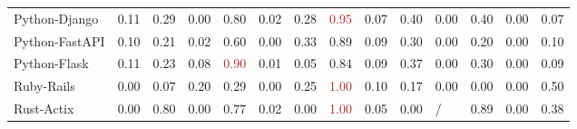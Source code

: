 \begin{table*}[h]
{\begin{tabular}{
l
x{1}{2}
x{1}{2}
x{1}{2}
x{1}{2}
x{1}{2}
x{1}{2}
x{1}{2}
x{1}{2}
x{1}{2}
x{1}{2}
x{1}{2}
x{1}{2}
x{1}{2}
}
Python-Django & 0.11 & 0.29 & 0.00 & 0.80 & 0.02 & 0.28 & \textcolor{brown}{0.95} & 0.07 & 0.40 & 0.00 & 0.40 & 0.00 & 0.07 \\
Python-FastAPI  & 0.10 & 0.21 & 0.02 & 0.60 & 0.00 & 0.33 & 0.89 & 0.09 & 0.30 & 0.00 & 0.20 & 0.00 & 0.10 \\
Python-Flask & 0.11 & 0.23 & 0.08 & \textcolor{brown}{0.90} & 0.01 & 0.05 & 0.84 & 0.09 & 0.37 & 0.00 & 0.30 & 0.00 & 0.09 \\
Ruby-Rails & 0.00 & 0.07 & 0.20 & 0.29 & 0.00 & 0.25 & \textcolor{brown}{1.00} & 0.10 & 0.17 & 0.00 & 0.00 & 0.00 & 0.50 \\
Rust-Actix & 0.00 & 0.80 & 0.00 & 0.77 & 0.02 & 0.00 & \textcolor{brown}{1.00} & 0.05 & 0.00 & / & 0.89 & 0.00 & 0.38 \\
\bottomrule
\end{tabular}}
\end{table*}
